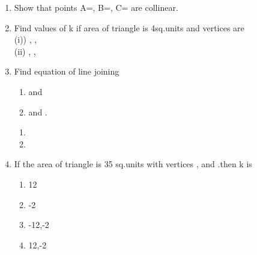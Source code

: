 \documentclass[journal,12pt,twocolumn]{IEEEtran}
\renewcommand\thesection{\arabic{section}}
\begin{document}
\begin{enumerate}[label=\thesection.\arabic*.,ref=\thesection.\theenumi]
\begin{enumerate}
\end{enumerate}
\item Show that points A=, B=, C= are collinear.
\\
\solution 

\item Find values of k if area of triangle is 4sq.units and vertices are \\
(i)) , ,  \\ (ii) , , 
\item Find equation of line joining
\begin{enumerate}
\item  {} and  
\item {} and .
\end{enumerate}
\solution
\begin{enumerate}
    \item 
    \item 
    
\end{enumerate}

\item If the area of triangle is 35 sq.units with vertices ,  and .then k is 
\begin{enumerate}
\item 12
\item -2
\item -12,-2
\item 12,-2
\end{enumerate}
\solution



\end{enumerate}
\end{document}

